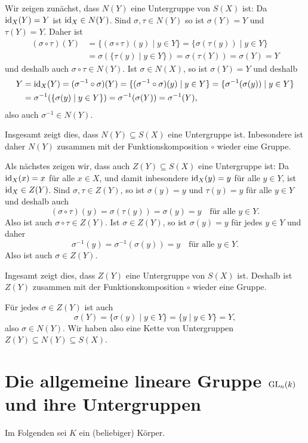 Wir zeigen zunächst, dass $N(Y)$ eine Untergruppe von $S(X)$ ist: Da $\mathrm{id}_X(Y) = Y$ ist $\mathrm{id}_X \in N(Y)$. Sind $\sigma, \tau \in N(Y)$ so ist $\sigma(Y) = Y$ und $\tau(Y) = Y$. Daher ist
\begin{align*}
 (\sigma \circ \tau)(Y)
 &= \{(\sigma \circ \tau)(y) \mid y \in Y\}
 = \{\sigma(\tau(y)) \mid y \in Y\} \\
 &= \sigma(\{\tau(y) \mid y \in Y\})
 = \sigma(\tau(Y))
 = \sigma(Y)
 = Y
\end{align*}
und deshalb auch $\sigma \circ \tau \in N(Y)$. Ist $\sigma \in N(X)$, so ist $\sigma(Y) = Y$ und deshalb
\begin{align*}
 Y
 &= \mathrm{id}_X(Y)
 = (\sigma^{-1} \circ \sigma)(Y)
 = \{(\sigma^{-1} \circ \sigma)(y) \mid y \in Y\}
 = \{\sigma^{-1}(\sigma(y)) \mid y \in Y\} \\
 &= \sigma^{-1}(\{\sigma(y) \mid y \in Y\})
 = \sigma^{-1}(\sigma(Y))
 = \sigma^{-1}(Y),
\end{align*}
also auch $\sigma^{-1} \in N(Y)$.

Insgesamt zeigt dies, dass $N(Y) \subseteq S(X)$ eine Untergruppe ist. Inbesondere ist daher $N(Y)$ zusammen mit der Funktionskomposition $\circ$ wieder eine Gruppe.

Als nächstes zeigen wir, dass auch $Z(Y) \subseteq S(X)$ eine Untergruppe ist: Da $\mathrm{id}_X(x) = x$ für alle $x \in X$, und damit inbesondere $\mathrm{id}_X(y) = y$ für alle $y \in Y$, ist $\mathrm{id}_X \in Z(Y)$. Sind $\sigma, \tau \in Z(Y)$, so ist $\sigma(y) = y$ und $\tau(y) = y$ für alle $y \in Y$ und deshalb auch
\[
 (\sigma \circ \tau)(y)
 = \sigma(\tau(y))
 = \sigma(y)
 = y
 \quad
 \text{für alle $y \in Y$}.
\]
Also ist auch $\sigma \circ \tau \in Z(Y)$. Ist $\sigma \in Z(Y)$, so ist $\sigma(y) = y$ für jedes $y \in Y$ und daher
\[
 \sigma^{-1}(y) = \sigma^{-1}(\sigma(y)) = y
 \quad
 \text{für alle $y \in Y$}.
\]
Also ist auch $\sigma \in Z(Y)$.

Ingesamt zeigt dies, dass $Z(Y)$ eine Untergruppe von $S(X)$ ist. Deshalb ist $Z(Y)$ zusammen mit der Funktionskomposition $\circ$ wieder eine Gruppe.

Für jedes $\sigma \in Z(Y)$ ist auch
\[
 \sigma(Y)
 = \{\sigma(y) \mid y \in Y\}
 = \{y \mid y \in Y\}
 = Y,
\]
also $\sigma \in N(Y)$. Wir haben also eine Kette von Untergruppen $Z(Y) \subseteq N(Y) \subseteq S(X)$.





\section{Die allgemeine lineare Gruppe \texorpdfstring{$\mathrm{GL}_n(k)$}{GLnk} und ihre Untergruppen}
Im Folgenden sei $K$ ein (beliebiger) Körper.



